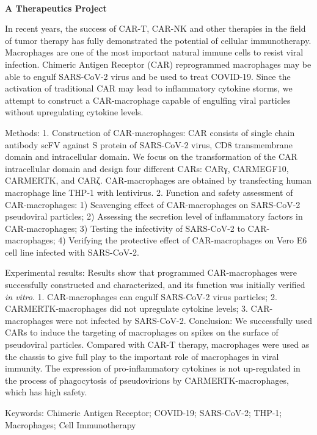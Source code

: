 \textbf{\\A Therapeutics Project\\}\begin{spacing}{1.5}

In recent years, the success of CAR-T, CAR-NK and other therapies in the field of tumor therapy has fully demonstrated the potential of cellular immunotherapy. Macrophages are one of the most important natural immune cells to resist viral infection. Chimeric Antigen Receptor (CAR) reprogrammed macrophages may be able to engulf SARS-CoV-2 virus and be used to treat COVID-19. Since the activation of traditional CAR may lead to inflammatory cytokine storms, we attempt to construct a CAR-macrophage capable of engulfing viral particles without upregulating cytokine levels.

Methods: 1. Construction of CAR-macrophages: CAR consists of single chain antibody scFV against S protein of SARS-CoV-2 virus, CD8 transmembrane domain and intracellular domain. We focus on the transformation of the CAR intracellular domain and design four different CARs: CARγ, CARMEGF10, CARMERTK, and CARζ. CAR-macrophages are obtained by transfecting human macrophage line THP-1 with lentivirus. 2. Function and safety assessment of CAR-macrophages: 1) Scavenging effect of CAR-macrophages on SARS-CoV-2 pseudoviral particles; 2) Assessing the secretion level of inflammatory factors in CAR-macrophages; 3) Testing the infectivity of SARS-CoV-2 to CAR-macrophages; 4) Verifying the protective effect of CAR-macrophages on Vero E6 cell line infected with SARS-CoV-2.

Experimental results: Results show that programmed CAR-macrophages were successfully constructed and characterized, and its function was initially verified \textit{in vitro}. 1. CAR-macrophages can engulf SARS-CoV-2 virus particles; 2. CARMERTK-macrophages did not upregulate cytokine levels; 3. CAR-macrophages were not infected by SARS-CoV-2. Conclusion: We successfully used CARs to induce the targeting of macrophages on spikes on the surface of pseudoviral particles. Compared with CAR-T therapy, macrophages were used as the chassis to give full play to the important role of macrophages in viral immunity. The expression of pro-inflammatory cytokines is not up-regulated in the process of phagocytosis of pseudovirions by CARMERTK-macrophages, which has high safety.

Keywords: Chimeric Antigen Receptor; COVID-19; SARS-CoV-2; THP-1; Macrophages; Cell Immunotherapy\end{spacing}
\\

